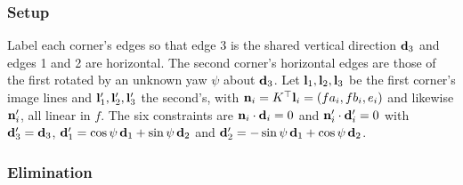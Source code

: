 \subsubsection{Setup}

Label each corner's edges so that edge 3 is the shared vertical direction $\mathbf{d}_3$ and edges 1 and 2 are horizontal. The second corner's horizontal edges are those of the first rotated by an unknown yaw $\psi$ about $\mathbf{d}_3$. Let $\mathbf{l}_1,\mathbf{l}_2,\mathbf{l}_3$ be the first corner's image lines and $\mathbf{l}_1',\mathbf{l}_2',\mathbf{l}_3'$ the second's, with $\mathbf{n}_i=K^{\top}\mathbf{l}_i=(fa_i,fb_i,e_i)$ and likewise $\mathbf{n}_i'$, all linear in $f$. The six constraints are $\mathbf{n}_i\cdot\mathbf{d}_i=0$ and $\mathbf{n}_i'\cdot\mathbf{d}_i'=0$ with $\mathbf{d}_3'=\mathbf{d}_3$, $\mathbf{d}_1'=\cos\psi\,\mathbf{d}_1+\sin\psi\,\mathbf{d}_2$ and $\mathbf{d}_2'=-\sin\psi\,\mathbf{d}_1+\cos\psi\,\mathbf{d}_2$.

\subsubsection{Elimination}\label{sec:elimination}

